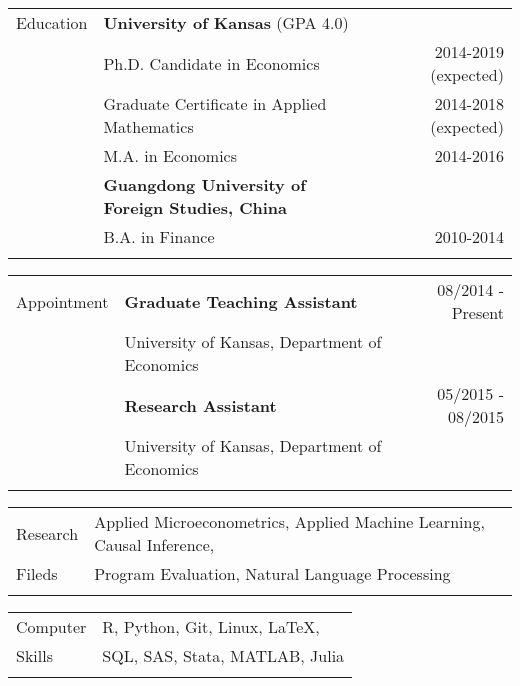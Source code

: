 \documentclass[letterpaper, 11pt]{article}
\begin{document}
\vspace{8mm}


\noindent \begin{tabular}{@{} p{3cm} p{10cm} r}
	\Large{Education}    & \textbf{University of Kansas} (GPA 4.0)\\
	& \hspace{5mm}Ph.D. Candidate in Economics & 2014-2019 (expected) \\
	& \hspace{5mm}Graduate Certificate in Applied Mathematics & 2014-2018 (expected) \\
	& \hspace{5mm}M.A. in Economics & 2014-2016 \\
	& \textbf{Guangdong University of Foreign Studies, China} \\
	& \hspace{5mm}B.A. in Finance & 2010-2014 \\
	& \\
\end{tabular}





\noindent \begin{tabular}{@{} p{3cm} p{10.5cm} r}
	\Large{Appointment}  &  \textbf{Graduate Teaching Assistant}  &  08/2014 - Present \\
    & University of Kansas, Department of Economics \\
	& \textbf{Research Assistant} &  05/2015 - 08/2015 \\
	& University of Kansas, Department of Economics \\
	\\
\end{tabular}





\noindent \begin{tabular}{@{} p{3cm} l}
	\Large{Research}  & Applied Microeconometrics, Applied Machine Learning, Causal Inference,  \\
	\Large{Fileds}    & Program Evaluation, Natural Language Processing \\
	& \\
\end{tabular}





\noindent \begin{tabular}{@{} p{3cm} l}
	\Large{Computer}  & R, Python, Git, Linux, \LaTeX,   \\
	\Large{Skills}    & SQL, SAS, Stata, MATLAB, Julia \\
	& \\
\end{tabular}
\end{document}
